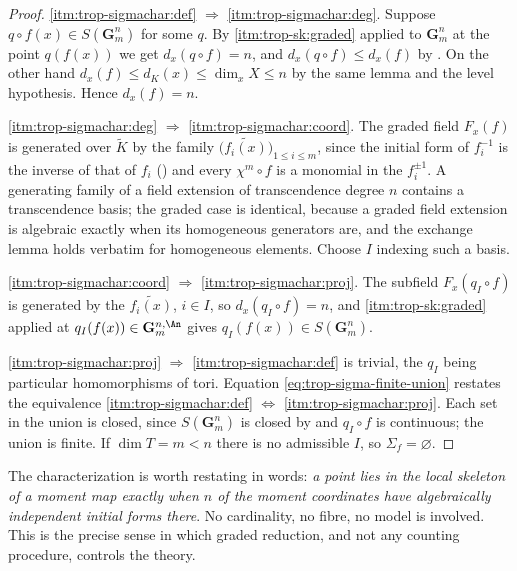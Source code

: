 \begin{proof}
\cref{itm:trop-sigmachar:def} $\Rightarrow$ \cref{itm:trop-sigmachar:deg}.
Suppose $q\circ f(x)\in S(\mathbf G_m^n)$ for some $q$. By
 \cref{itm:trop-sk:graded} applied to
$\mathbf G_m^n$ at the point $q(f(x))$ we get $d_x(q\circ f)=n$, and
$d_x(q\circ f)\le d_x(f)$ by . On the
other hand $d_x(f)\le d_K(x)\le\dim_xX\le n$ by the same lemma and the
level hypothesis. Hence $d_x(f)=n$.

\cref{itm:trop-sigmachar:deg} $\Rightarrow$ \cref{itm:trop-sigmachar:coord}.
The graded field $F_x(f)$ is generated over $\widetilde K$ by the family
$\bigl(\widetilde{f_i(x)}\bigr)_{1\le i\le m}$, since the initial form of
$f_i^{-1}$ is the inverse of that of $f_i$
() and every $\chi^m\circ f$ is a monomial
in the $f_i^{\pm1}$. A generating family of a field extension of
transcendence degree $n$ contains a transcendence basis; the graded case is
identical, because a graded field extension is algebraic exactly when its
homogeneous generators are, and the exchange lemma holds verbatim for
homogeneous elements. Choose $I$ indexing such a basis.

\cref{itm:trop-sigmachar:coord} $\Rightarrow$ \cref{itm:trop-sigmachar:proj}.
The subfield $F_x(q_I\circ f)$ is generated by the
$\widetilde{f_i(x)}$, $i\in I$, so $d_x(q_I\circ f)=n$, and
 \cref{itm:trop-sk:graded} applied at
$q_I(f(x))\in\mathbf G_m^{n,\An}$ gives $q_I(f(x))\in S(\mathbf G_m^n)$.

\cref{itm:trop-sigmachar:proj} $\Rightarrow$ \cref{itm:trop-sigmachar:def} is
trivial, the $q_I$ being particular homomorphisms of tori. Equation
\eqref{eq:trop-sigma-finite-union} restates the equivalence
\cref{itm:trop-sigmachar:def} $\Leftrightarrow$
\cref{itm:trop-sigmachar:proj}. Each set in the union is closed, since
$S(\mathbf G_m^n)$ is closed by  and
$q_I\circ f$ is continuous; the union is finite. If $\dim T=m<n$ there is
no admissible $I$, so $\Sigma_f=\varnothing$.
\end{proof}

The characterization is worth restating in words: \emph{a point lies in the
local skeleton of a moment map exactly when $n$ of the moment coordinates
have algebraically independent initial forms there}. No cardinality, no
fibre, no model is involved. This is the precise sense in which graded
reduction, and not any counting procedure, controls the theory.


